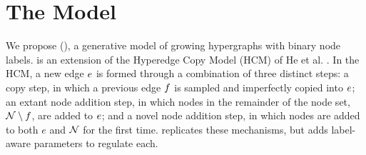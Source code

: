 \documentclass[aps,pre,reprint,superscriptaddress,nofootinbib]{revtex4-2}
\begin{document}
\section{The \model{} Model} \label{sec:model-description}


    We propose \Model{} (\model{}), a generative model of growing hypergraphs with binary node labels. 
    \model{} is an extension of the Hyperedge Copy Model (HCM) of He et al. \cite{heEdgeCorrelationsLink2025}. 
    In the HCM, a new edge $e$ is formed through a combination of three distinct steps: a copy step, in which a previous edge $f$ is sampled and imperfectly copied into $e$; an extant node addition step, in which nodes in the remainder of the node set, $\mathcal{N} \setminus f$, are added to $e$; and a novel node addition step, in which nodes are added to both $e$ and $\mathcal{N}$ for the first time.
    \model{} replicates these mechanisms, but adds label-aware parameters to regulate each. 
\end{document}
